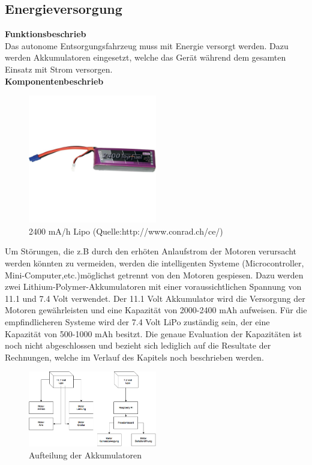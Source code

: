 \subsection{Energieversorgung}

\textbf{Funktionsbeschrieb}\\[0.2cm]
Das autonome Entsorgungsfahrzeug muss mit Energie versorgt werden. Dazu werden Akkumulatoren eingesetzt, welche das Gerät während dem gesamten Einsatz mit Strom versorgen. 
\\[0.2cm]
\textbf{Komponentenbeschrieb}
\begin{figure}[h]
\centering
\includegraphics[width=0.5\textwidth]{03_Loesungskonzept/pictures/lipo.jpg}
\caption{2400 mA/h Lipo  (Quelle:http://www.conrad.ch/ce/)}	
\end{figure}
Um Störungen, die z.B durch den erhöten Anlaufstrom der Motoren verursacht werden könnten zu vermeiden, werden die intelligenten Systeme (Microcontroller, Mini-Computer,etc.)möglichst getrennt von den Motoren gespiesen. Dazu werden zwei Lithium-Polymer-Akkumulatoren mit einer voraussichtlichen Spannung von 11.1 und 7.4 Volt verwendet.
Der 11.1 Volt Akkumulator wird die Versorgung der Motoren gewährleisten und eine Kapazität von 2000-2400 mAh aufweisen. Für die empfindlicheren Systeme wird der 7.4 Volt LiPo zuständig sein, der eine Kapazität von 500-1000 mAh besitzt.
Die genaue Evaluation der Kapazitäten ist noch nicht abgeschlossen und bezieht sich lediglich auf die Resultate der Rechnungen, welche im Verlauf des Kapitels noch beschrieben werden.
\begin{figure}[h]
\centering
\includegraphics[width=0.5\textwidth]{03_Loesungskonzept/pictures/speisung.png}
\caption{Aufteilung der Akkumulatoren}	
\end{figure}
